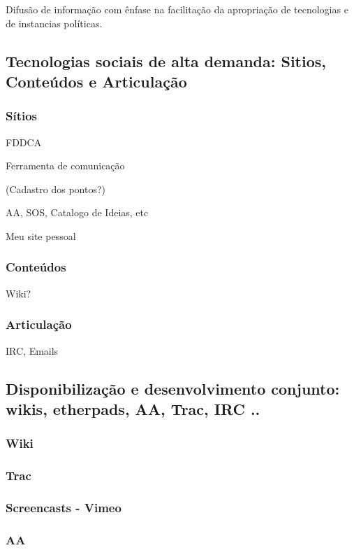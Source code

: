   Difusão de informação com ênfase na facilitação
  da apropriação de tecnologias e de instancias políticas.

   \subsection{Tecnologias sociais de alta demanda: Sitios, Conteúdos e Articulação}

      \subsubsection{Sítios}

      FDDCA

      Ferramenta de comunicação

      (Cadastro dos pontos?)

      AA, SOS, Catalogo de Ideias, etc

      Meu site pessoal


      \subsubsection{Conteúdos}

      Wiki?

      \subsubsection{Articulação}

      IRC, Emails

\subsection{Disponibilização e desenvolvimento conjunto: wikis, etherpads, AA, Trac, IRC ..}

\subsubsection{Wiki}

\subsubsection{Trac}

\subsubsection{Screencasts - Vimeo}

\subsubsection{AA}

